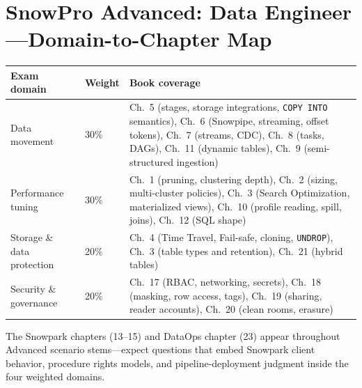 \section{SnowPro Advanced: Data Engineer---Domain-to-Chapter Map}
\begin{center}
\footnotesize
\begin{tabular}{@{}p{4.6cm}p{1.4cm}p{7.8cm}@{}}
\toprule
\textbf{Exam domain} & \textbf{Weight} & \textbf{Book coverage} \\
\midrule
Data movement & 30\% & Ch.~5 (stages, storage integrations, \texttt{COPY INTO} semantics), Ch.~6 (Snowpipe, streaming, offset tokens), Ch.~7 (streams, CDC), Ch.~8 (tasks, DAGs), Ch.~11 (dynamic tables), Ch.~9 (semi-structured ingestion) \\
Performance tuning & 30\% & Ch.~1 (pruning, clustering depth), Ch.~2 (sizing, multi-cluster policies), Ch.~3 (Search Optimization, materialized views), Ch.~10 (profile reading, spill, joins), Ch.~12 (SQL shape) \\
Storage \& data protection & 20\% & Ch.~4 (Time Travel, Fail-safe, cloning, \texttt{UNDROP}), Ch.~3 (table types and retention), Ch.~21 (hybrid tables) \\
Security \& governance & 20\% & Ch.~17 (RBAC, networking, secrets), Ch.~18 (masking, row access, tags), Ch.~19 (sharing, reader accounts), Ch.~20 (clean rooms, erasure) \\
\bottomrule
\end{tabular}
\end{center}

\noindent The Snowpark chapters (13--15) and DataOps chapter (23) appear throughout Advanced
scenario stems---expect questions that embed Snowpark client behavior, procedure rights models,
and pipeline-deployment judgment inside the four weighted domains.

